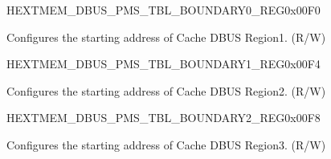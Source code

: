 \begin{register}{H}{EXTMEM\_DBUS\_PMS\_TBL\_BOUNDARY0\_REG}{0x00F0}\label{regdesc:EXTMEMDBUSPMSTBLBOUNDARY0REG}
%
%
\regnewline%
\begin{regdesc}\begin{reglist}
\label{fielddesc:EXTMEMDBUSPMSBOUNDARY0}\item [EXTMEM\_DBUS\_PMS\_BOUNDARY0] Configures the starting address of Cache DBUS Region1. (R/W)
\end{reglist}\end{regdesc}
\end{register}


\begin{register}{H}{EXTMEM\_DBUS\_PMS\_TBL\_BOUNDARY1\_REG}{0x00F4}\label{regdesc:EXTMEMDBUSPMSTBLBOUNDARY1REG}
%
%
\regnewline%
\begin{regdesc}\begin{reglist}
\label{fielddesc:EXTMEMDBUSPMSBOUNDARY1}\item [EXTMEM\_DBUS\_PMS\_BOUNDARY1] Configures the starting address of Cache DBUS Region2. (R/W)
\end{reglist}\end{regdesc}
\end{register}


\begin{register}{H}{EXTMEM\_DBUS\_PMS\_TBL\_BOUNDARY2\_REG}{0x00F8}\label{regdesc:EXTMEMDBUSPMSTBLBOUNDARY2REG}
%
%
\regnewline%
\begin{regdesc}\begin{reglist}
\label{fielddesc:EXTMEMDBUSPMSBOUNDARY2}\item [EXTMEM\_DBUS\_PMS\_BOUNDARY2] Configures the starting address of Cache DBUS Region3. (R/W)
\end{reglist}\end{regdesc}
\end{register}


